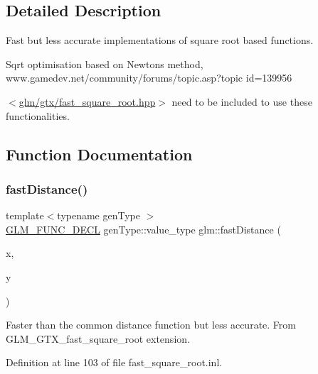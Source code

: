 \subsection{Detailed Description}
Fast but less accurate implementations of square root based functions. 


\begin{DoxyItemize}
\item Sqrt optimisation based on Newton\textquotesingle{}s method, www.\+gamedev.\+net/community/forums/topic.asp?topic id=139956
\end{DoxyItemize}

$<$\hyperlink{fast__square__root_8hpp}{glm/gtx/fast\+\_\+square\+\_\+root.\+hpp}$>$ need to be included to use these functionalities. 

\subsection{Function Documentation}
\mbox{\label{group__gtx__fast__square__root_ga69778792fcadc29f586efa3ec2118cdc}} 
\subsubsection{\texorpdfstring{fast\+Distance()}{fastDistance()}}
{\footnotesize\ttfamily template$<$typename gen\+Type $>$ \\
\hyperlink{setup_8hpp_ab2d052de21a70539923e9bcbf6e83a51}{G\+L\+M\+\_\+\+F\+U\+N\+C\+\_\+\+D\+E\+CL} gen\+Type\+::value\+\_\+type glm\+::fast\+Distance (\begin{DoxyParamCaption}\item[{gen\+Type const \&}]{x,  }\item[{gen\+Type const \&}]{y }\end{DoxyParamCaption})}

Faster than the common distance function but less accurate. From G\+L\+M\+\_\+\+G\+T\+X\+\_\+fast\+\_\+square\+\_\+root extension. 

Definition at line 103 of file fast\+\_\+square\+\_\+root.\+inl.

\mbox{\label{group__gtx__fast__square__root_ga65237d716748c6262f316ec1eaf7f073}} 

